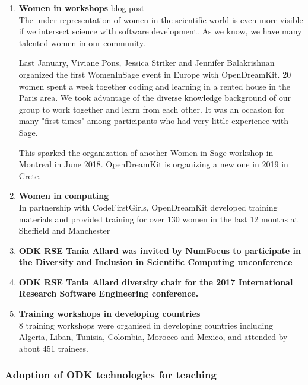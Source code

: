 \begin{enumerate}
\item \textbf{Women in \Sage workshops} \href{https://opendreamkit.org/2017/04/06/WomenInSage/}{blog post}\\
  The under-representation of women in the scientific world is even
  more visible if we intersect science with software development. As
  we know, we have many talented women in our community.

  Last January, Viviane Pons, Jessica Striker and Jennifer
  Balakrishnan organized the first WomenInSage event in Europe with
  OpenDreamKit. 20 women spent a week together coding and learning in
  a rented house in the Paris area. We took advantage of the diverse
  knowledge background of our group to work together and learn from
  each other. It was an occasion for many "first times" among
  participants who had very little experience with Sage.

  This sparked the organization of another Women in Sage workshop in
  Montreal in June 2018. OpenDreamKit is organizing a new one in 2019
  in Crete.

\item \textbf{Women in computing}\\
  In partnership with CodeFirstGirls, OpenDreamKit developed training
  materials and provided training for over 130 women in the last 12
  months at Sheffield and Manchester

\item \textbf{ODK RSE Tania Allard was invited by NumFocus to
    participate in the Diversity and Inclusion in Scientific Computing
    unconference}

\item \textbf{ODK RSE Tania Allard diversity chair for the 2017
    International Research Software Engineering conference.}

\item \textbf{Training workshops in developing countries }\\
  8 training workshops were organised in developing countries
  including Algeria, Liban, Tunisia, Colombia, Morocco and Mexico, and
  attended by about 451 trainees.
\end{enumerate}

\subsubsection{Adoption of ODK technologies for teaching}

